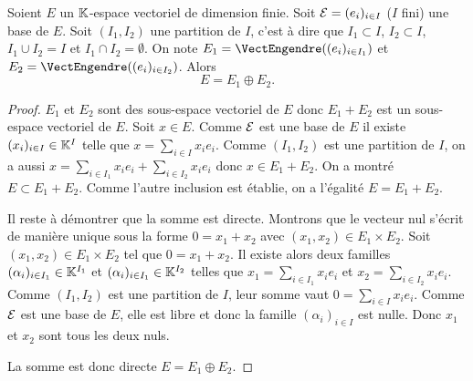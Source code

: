 \begin{theo}\label{theo:theosuppdimfinie}
  Soient $E$ un $\mathbb{K}$-espace vectoriel de dimension finie. Soit $\mathcal{E}=(e_i)_{i \in I}$ ($I$ fini) une base de $E$. Soit $(I_1, I_2)$ une partition de $I$, c'est à dire que $I_1 \subset I$, $I_2 \subset I$, $I_1 \cup I_2 =I$ et $I_1 \cap I_2 = \emptyset$. On note $E_1 = \VectEngendre((e_i)_{i \in I_1})$ et $E_2 = \VectEngendre((e_i)_{i \in I_2})$. Alors
  \begin{equation}
    E = E_1 \oplus E_2.
  \end{equation}
\end{theo}
\begin{proof}
  $E_1$ et $E_2$ sont des sous-espace vectoriel de $E$ donc $E_1+E_2$ est un sous-espace vectoriel de $E$. Soit $x \in E$. Comme $\mathcal{E}$ est une base de $E$ il existe $(x_i)_{i \in I} \in \mathbb{K}^I$ telle que $x= \sum_{i \in I} x_i e_i$. Comme $(I_1,I_2)$ est une partition de $I$, on a aussi $x = \sum_{i \in I_1} x_i e_i + \sum_{i \in I_2} x_i e_i$ donc $x \in E_1+E_2$. On a montré $E \subset E_1+E_2$. Comme l'autre inclusion est établie, on a l'égalité $E=E_1+E_2$.

Il reste à démontrer que la somme est directe. Montrons que le vecteur nul s'écrit de manière unique sous la forme $0=x_1+x_2$ avec $(x_1,x_2) \in E_1 \times E_2$. Soit $(x_1,x_2) \in E_1 \times E_2$ tel que $0=x_1+x_2$. Il existe alors deux familles $(\alpha_i)_{i \in I_1} \in \mathbb{K}^{I_1}$ et $(\alpha_i)_{i \in I_1} \in \mathbb{K}^{I_2}$ telles que $x_1 = \sum_{i \in I_1} x_i e_i$ et  $x_2 = \sum_{i \in I_2} x_i e_i$. Comme $(I_1,I_2)$ est une partition de $I$, leur somme vaut $0 = \sum_{i \in I} x_i e_i$. Comme $\mathcal{E}$ est une base de $E$, elle est libre et donc la famille $(\alpha_i)_{i \in I}$ est nulle. Donc $x_1$ et $x_2$ sont tous les deux nuls.

La somme est donc directe $E = E_1 \oplus E_2$.
\end{proof}

